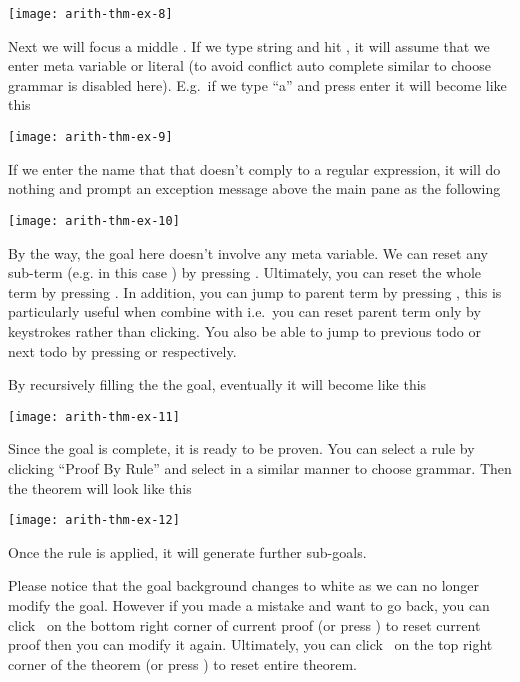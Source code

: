 \documentclass[master.tex]{subfiles}
\begin{document}
\begin{center}
\texttt{[image: arith-thm-ex-8]}
\end{center}

\hspace{1ex}

Next we will focus a middle . If we type string and hit 
, it will assume that we enter meta variable or literal (to avoid conflict
auto complete similar to choose grammar is disabled here). E.g.\ if we type
``a'' and press enter it will become like this

\begin{center}
\texttt{[image: arith-thm-ex-9]}
\end{center}

If we enter the name that that doesn't comply to a regular expression, it will
do nothing and prompt an exception message above the main pane as the following

\begin{center}
\texttt{[image: arith-thm-ex-10]}
\end{center}

By the way, the goal here doesn't involve any meta variable. We can reset any
sub-term (e.g. in this case ) by pressing . Ultimately,
you can reset the whole term by pressing . In addition, you can jump
to parent term by pressing , this is particularly useful when
combine with  i.e.\ you can reset parent term only by keystrokes
rather than clicking. You also be able to jump to previous todo or next todo by
pressing  or  respectively.

By recursively filling the the goal, eventually it will become like this

\texttt{[image: arith-thm-ex-11]}

Since the goal is complete, it is ready to be proven. You can select a rule by
clicking ``Proof By Rule'' and select  in a similar manner to
choose grammar. Then the theorem will look like this

\texttt{[image: arith-thm-ex-12]}

\hspace{1ex}

Once the rule is applied, it will generate further sub-goals.

Please notice that the goal background changes to white as we can no longer
modify the goal. However if you made a mistake and want to go back, you can
click \closeButton\ on the bottom right corner of current proof (or press
) to reset current proof then you can modify it again. Ultimately,
you can click \resetButton\ on the top right corner of the theorem (or press
) to reset entire theorem.
\end{document}
